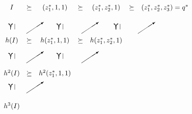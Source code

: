 $$
\begin{picture}(0,0)

\qbezier(12,51)(15,51)(15,43)
\qbezier(18,51)(15,51)(15,43)
\put(21,43){\line(0,1){8}}

\qbezier(82,51)(85,51)(85,43)
\qbezier(88,51)(85,51)(85,43)
\put(91,43){\line(0,1){8}}

\qbezier(12,8)(15,8)(15,0)
\qbezier(18,8)(15,8)(15,0)
\put(21,0){\line(0,1){8}}

\qbezier(12,-37)(15,-37)(15,-45)
\qbezier(18,-37)(15,-37)(15,-45)
\put(21,-45){\line(0,1){8}}

\qbezier(165,51)(168,51)(168,43)
\qbezier(171,51)(168,51)(168,43)
\put(174,43){\line(0,1){8}}

\qbezier(82,8)(85,8)(85,0)
\qbezier(88,8)(85,8)(85,0)
\put(91,0){\line(0,1){8}}

\put(38,37){\vector(3,2){25}}
\put(118,37){\vector(3,2){25}}
\put(118,-6){\vector(3,2){25}}
\put(200,37){\vector(3,2){25}}
\put(38,-6){\vector(3,2){25}}
\put(38,-50){\vector(3,2){25}}

\end{picture}
\begin{array}{ccccccc}
I & \succeq & (z_1^*,1,1) & \succeq & (z_1^*,z_2^*,1) & \succeq
& (z_1^*,z_2^*,z_3^*) = q^*\\
&&&&&&\\
&&&&&&\\
&&&&&&\\
h(I) & \succeq & h(z_1^*,1,1) & \succeq & h(z_1^*,z_2^*,1) &&\\
&&&&&&\\
&&&&&&\\
&&&&&&\\
h^2(I) & \succeq & h^2(z_1^*,1,1) &&&&\\
&&&&&&\\
&&&&&&\\
&&&&&&\\
h^3(I) &&&&&&
\end{array}
$$
